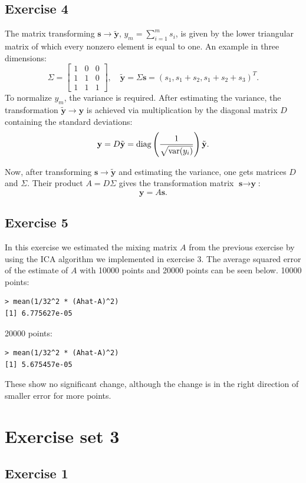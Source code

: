 \documentclass{article}
\begin{document}
\subsection{Exercise 4}
The matrix transforming $\textbf{s} \to \tilde{\textbf{y}}$, $y_m = \sum_{i=1}^m s_i$, is given by
the lower triangular matrix of which every nonzero element is equal to
one. An example in three dimensions:
\[
\Sigma =
\left[ \begin{array}{ccc}
1 & 0 & 0 \\
1 & 1 & 0 \\
1 & 1 & 1 \end{array} \right],
\quad
\tilde{\textbf{y}} = \Sigma \textbf{s} = (s_1, s_1 + s_2, s_1 + s_2 + s_3)^T.
\]
To normalize $y_m$, the variance is required. After estimating
the variance, the transformation $\tilde{\textbf{y}} \to \textbf{y}$
is achieved via multiplication by the diagonal matrix $D$ containing the
standard deviations: 
\[
\textbf{y} = D \tilde{\textbf{y}}= \textup{diag} \left( \frac{1}{\sqrt{\textup{var}(y_i)}}
\right) \tilde{\textbf{y}}.
\]

Now, after transforming $\textbf{s} \to \tilde{\textbf{y}}$ and
estimating the variance, one gets matrices $D$ and $\Sigma$. Their
product $A = D \Sigma$ gives the transformation matrix $\textbf{s} \to
\textbf{y}$:
\[
\textbf{y} = A\textbf{s}.
\]
\subsection{Exercise 5}
In this exercise we estimated the mixing matrix $A$ from the previous
exercise by using the ICA algorithm we implemented in exercise 3. The
average squared error of the estimate of $A$ with 10000 points and
20000 points can be seen below. 
10000 points:
\begin{verbatim}
> mean(1/32^2 * (Ahat-A)^2)
[1] 6.775627e-05
\end{verbatim}
20000 points:
\begin{verbatim}
> mean(1/32^2 * (Ahat-A)^2)
[1] 5.675457e-05
\end{verbatim}
These show no significant change, although the change is in the right
direction of smaller error for more points. 

\section{Exercise set 3}

\subsection{Exercise 1}
\end{document}
